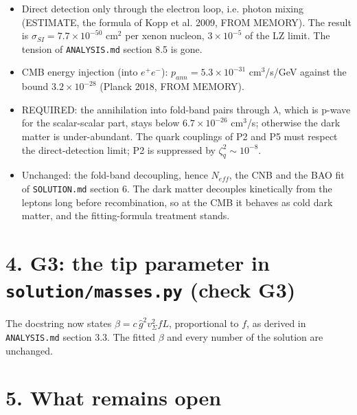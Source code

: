 \documentclass[11pt]{article}
\begin{document}
\begin{itemize}
\item Direct detection only through the electron loop, i.e. photon mixing (ESTIMATE, the formula of Kopp et al. 2009, FROM MEMORY). The result is $\sigma_{SI} = 7.7\times10^{-50}$ cm$^2$ per xenon nucleon, $3\times10^{-5}$ of the LZ limit. The tension of \texttt{ANALYSIS.\allowbreak{}md} section 8.5 is gone.
\item CMB energy injection (into $e^+e^-$): $p_{ann} = 5.3\times10^{-31}$ cm$^3$/s/GeV against the bound $3.2\times10^{-28}$ (Planck 2018, FROM MEMORY).
\item REQUIRED: the annihilation into fold-band pairs through $\lambda$, which is p-wave for the scalar-scalar part, stays below $6.7\times10^{-26}$ cm$^3$/s; otherwise the dark matter is under-abundant. The quark couplings of P2 and P5 must respect the direct-detection limit; P2 is suppressed by $\zeta_q^2 \sim 10^{-8}$.
\item Unchanged: the fold-band decoupling, hence $N_{eff}$, the CNB and the BAO fit of \texttt{SOLUTION.\allowbreak{}md} section 6. The dark matter decouples kinetically from the leptons long before recombination, so at the CMB it behaves as cold dark matter, and the fitting-formula treatment stands.
\end{itemize}

\section*{4. G3: the tip parameter in \texttt{solution/\allowbreak{}masses.\allowbreak{}py} (check G3)}

The docstring now states $\beta = c\,\hat g^2v_\Sigma^2fL$, proportional to $f$, as derived in \texttt{ANALYSIS.\allowbreak{}md} section 3.3. The fitted $\beta$ and every number of the solution are unchanged.

\section*{5. What remains open}
\end{document}
